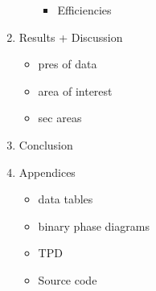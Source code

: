 \documentclass[10pt,a4paper,twoside]{article}
\begin{document}
\begin{enumerate}
\begin{itemize}
\begin{itemize}
  	 	\item Efficiencies
  	 \end{itemize} 
  \end{itemize}
  \item Results + Discussion
  \begin{itemize}
  	\item pres of data
  	\item area of interest
  	\item sec areas
  \end{itemize}
  \item Conclusion
  \item Appendices
  \begin{itemize}
  	\item data tables
  	\item binary phase diagrams
  	\item TPD
  	\item Source code
  \end{itemize}
\end{enumerate}




	
\end{document}
